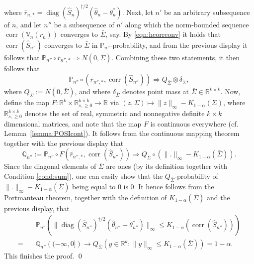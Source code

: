 \documentclass[preprint]{imsart}
\newcommand{\R}{{\mathbb R}}
\DeclareMathOperator{\diag}{diag}
\DeclareMathOperator{\corr}{corr}
\numberwithin{equation}{section}
\begin{document}
%
where $\bar{r}_{n, *} = \diag(\hat{S}_n)^{\dagger/2} (\hat{\theta}_n - \theta^*_n)$. Next, let $n'$ be an arbitrary subsequence of $n$, and let $n''$ be a subsequence of $n'$ along which the norm-bounded sequence $\corr(\mathbb{V}_n(r_n))$ converges to $\bar{\Sigma}$, say. By \eqref{eqn:hcorrconv} it holds that $\corr(\hat{S}_{n''})$ converges to $\bar{\Sigma}$ in $\mathbb{P}_{n''}$-probability, and from the previous display it follows that $\mathbb{P}_{n''} \circ  \bar{r}_{n'',*}  \Rightarrow N(0, \bar{\Sigma})$. Combining these two statements, it then follows that 
%
\begin{equation}
\mathbb{P}_{n''} \circ (\bar{r}_{{n''}, *}, \corr(\hat{S}_{n''})) \Rightarrow Q_{\bar{\Sigma}} \otimes \delta_{\bar{\Sigma}},
\end{equation}
%
where $Q_{\bar{\Sigma}} := N(0, \bar{\Sigma})$, and where $\delta_{\bar{\Sigma}}$ denotes point mass at $\bar{\Sigma} \in \R^{k \times k}$. Now, define the map $F: \R^k \times \R^{k \times k}_{s, \geq 0}\to\R$ via $(z, \Sigma) \mapsto \|z\|_{\infty} - K_{1-\alpha}(\Sigma)$, where $\R^{k \times k}_{s, \geq 0}$ denotes the set of real, symmetric and nonnegative definite $k \times k$ dimensional matrices, and note that the map $F$ is continuous everywhere (cf. Lemma~\ref{lemma:POSIcont}). It follows from the continuous mapping theorem together with the previous display that
%
\begin{equation}
\mathbb{Q}_{n''} := \mathbb{P}_{n''} \circ F(\bar{r}_{{n''}, *}, \corr(\hat{S}_{n''})) \Rightarrow Q_{\bar{\Sigma}} \circ \left(\|.\|_{\infty} - K_{1-\alpha}(\bar{\Sigma})\right).
\end{equation}
%
Since the diagonal elements of $\bar{\Sigma}$ are ones (by its definition together with Condition \ref{cond:sum}), one can easily show that the $Q_{\bar{\Sigma}}$-probability of $\|.\|_{\infty} - K_{1-\alpha}(\bar{\Sigma})$ being equal to $0$ is $0$. It hence follows from the Portmanteau theorem, together with the definition of $ K_{1-\alpha}(\bar{\Sigma})$ and the previous display, that
%
\begin{align}
&\mathbb{P}_{n''} \left( \| \diag(\hat{S}_{n''})^{\dagger/2} (\hat{\theta}_{n''} - \theta^*_{n''}) \|_{\infty} \leq K_{1-\alpha}(\corr(\hat{S}_{n''})) \right) \\ 
= \quad &\mathbb{Q}_{n''} \left((-\infty, 0]  \right)
\to Q_{\bar{\Sigma}} \left(y \in \R^k: \|y\|_{\infty} \leq K_{1-\alpha}(\bar{\Sigma})\right) = 1-\alpha.
\end{align}
%
This finishes the proof. \hfill\qed
\end{document}
